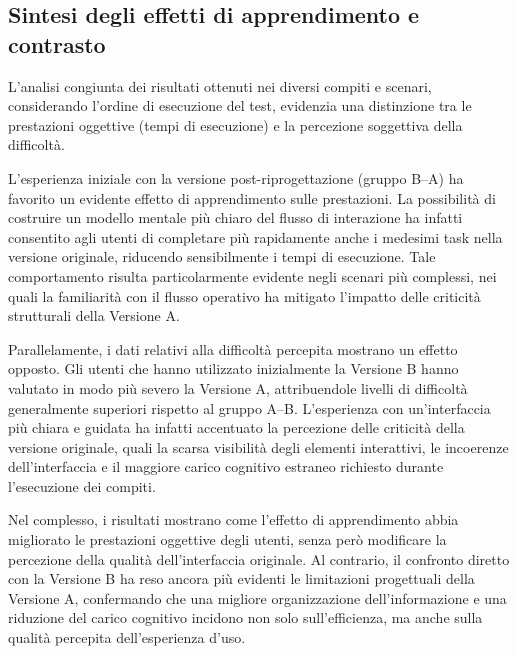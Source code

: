 

\subsection*{Sintesi degli effetti di apprendimento e contrasto}

L'analisi congiunta dei risultati ottenuti nei diversi compiti e scenari, considerando l'ordine di esecuzione del test, evidenzia una distinzione tra le prestazioni oggettive (tempi di esecuzione) e la percezione soggettiva della difficoltà.

L'esperienza iniziale con la versione post-riprogettazione (gruppo B--A) ha favorito un evidente effetto di apprendimento sulle prestazioni. La possibilità di costruire un modello mentale più chiaro del flusso di interazione ha infatti consentito agli utenti di completare più rapidamente anche i medesimi task nella versione originale, riducendo sensibilmente i tempi di esecuzione. Tale comportamento risulta particolarmente evidente negli scenari più complessi, nei quali la familiarità con il flusso operativo ha mitigato l'impatto delle criticità strutturali della Versione A.

Parallelamente, i dati relativi alla difficoltà percepita mostrano un effetto opposto. Gli utenti che hanno utilizzato inizialmente la Versione B hanno valutato in modo più severo la Versione A, attribuendole livelli di difficoltà generalmente superiori rispetto al gruppo A--B. L'esperienza con un'interfaccia più chiara e guidata ha infatti accentuato la percezione delle criticità della versione originale, quali la scarsa visibilità degli elementi interattivi, le incoerenze dell'interfaccia e il maggiore carico cognitivo estraneo richiesto durante l'esecuzione dei compiti.

Nel complesso, i risultati mostrano come l'effetto di apprendimento abbia migliorato le prestazioni oggettive degli utenti, senza però modificare la percezione della qualità dell'interfaccia originale. Al contrario, il confronto diretto con la Versione B ha reso ancora più evidenti le limitazioni progettuali della Versione A, confermando che una migliore organizzazione dell'informazione e una riduzione del carico cognitivo incidono non solo sull'efficienza, ma anche sulla qualità percepita dell'esperienza d'uso.





